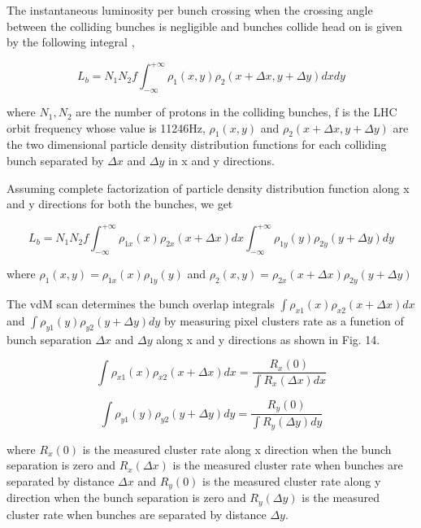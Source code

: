 The instantaneous luminosity  per bunch crossing when the crossing angle between the colliding bunches is negligible and bunches collide head on is given by the following integral \cite{CMS-PAS-LUM-13-001}, 

\begin{equation}
L_{b} = N_1 N_2 f \int^{+\infty}_{-\infty} \rho_1(x,y) \rho_2(x+\Delta x, y+\Delta y) dx dy 
\end{equation}

where $N_1, N_2$ are the number of protons in the colliding bunches, f is the LHC orbit frequency whose value is 11246Hz,  $\rho_1(x,y)$ and $\rho_2(x+\Delta x,y+\Delta y)$ are the two dimensional particle density distribution functions for each colliding bunch separated by $\Delta x$ and $\Delta y$ in x and y directions. 

Assuming complete factorization of particle density distribution function along x and y directions for both the bunches, we get 

\begin{equation}
L_{b} = N_1 N_2 f \int^{+\infty}_{-\infty} \rho_{1x}(x) \rho_{2x}(x+\Delta x)  dx   \int^{+\infty}_{-\infty} \rho_{1y}(y) \rho_{2y}(y+\Delta y)  dy 
\end{equation}

where $\rho_1(x,y) = \rho_{1x}(x) \rho_{1y} (y)$ and $\rho_2(x,y) = \rho_{2x}(x+\Delta x) \rho_{2y} (y+\Delta y)$ 

The vdM scan determines the bunch  overlap integrals $\int \rho_{x1} (x) \rho_{x2} (x+\Delta x) dx$ and  $\int \rho_{y1}(y) \rho_{y2} (y+\Delta y) dy$ by measuring pixel clusters rate as a function of bunch separation $\Delta x$ and $\Delta y$ along x and y directions as shown in Fig. 14. 

\begin{equation}
\int \rho_{x1} (x) \rho_{x2} (x+\Delta x) dx = \frac{R_x(0)}{\int R_x(\Delta x)dx} 
\end{equation}

\begin{equation}
\int \rho_{y1} (y) \rho_{y2} (y+\Delta y) dy = \frac{R_y(0)}{\int R_y(\Delta y)dy} 
\end{equation}

where $R_x(0)$ is the measured cluster rate along x direction when the bunch separation is zero and $R_x(\Delta x)$ is the measured cluster rate when bunches are separated by distance $\Delta x$ and $R_y(0)$ is the measured cluster rate along y direction when the bunch separation is zero and $R_y(\Delta y)$ is the measured cluster rate when bunches are separated by distance $\Delta y$. 

